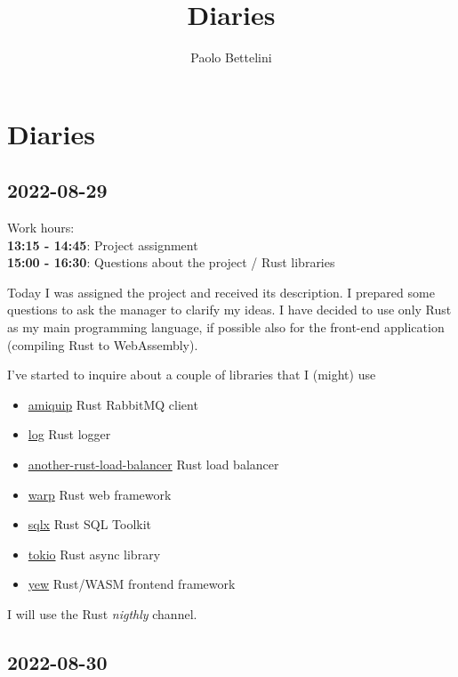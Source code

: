 \documentclass{article}
\title{Diaries}
\author{Paolo Bettelini}
\date{}
\begin{document}
\maketitle
\tableofcontents
\pagebreak

\section{Diaries}

\subsection{2022-08-29}

Work hours:\\
\textbf{13:15 - 14:45}: Project assignment
\\
\textbf{15:00 - 16:30}: Questions about the project / Rust libraries

Today I was assigned the project and received its description.
I prepared some questions to ask the manager to clarify my ideas.
I have decided to use only Rust as my main programming language, if possible
also for the front-end application (compiling Rust to WebAssembly).

I've started to inquire about a couple of libraries that I (might) use
\begin{itemize}
    \item \href{https://github.com/jgallagher/amiquip}{amiquip} Rust RabbitMQ client
    \item \href{https://github.com/rust-lang/log}{log} Rust logger
    \item \href{https://github.com/another-rust-load-balancer/another-rust-load-balancer}{another-rust-load-balancer} Rust load balancer
    \item \href{https://crates.io/crates/warp}{warp} Rust web framework
    \item \href{https://github.com/launchbadge/sqlx}{sqlx} Rust SQL Toolkit
    \item \href{https://github.com/tokio-rs/tokio}{tokio} Rust async library
    \item \href{https://github.com/tokio-rs/tokio}{yew} Rust/WASM frontend framework
\end{itemize}

I will use the Rust \textit{nigthly} channel.

\subsection{2022-08-30}
\end{document}
